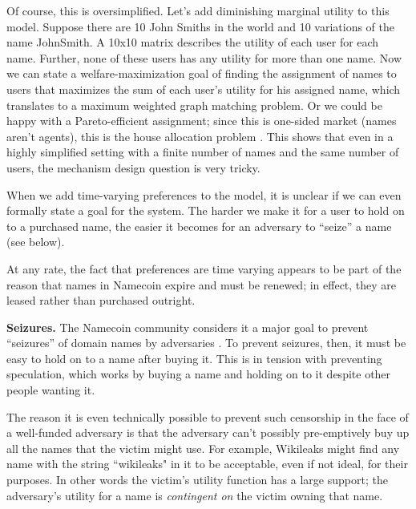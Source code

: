 Of course, this is oversimplified. Let's add diminishing marginal utility to this model. Suppose there are 10 John Smiths in the world and 10 variations of the name \textsf{JohnSmith}. A 10x10 matrix describes the utility of each user for each name. Further, none of these users has any utility for more than one name. Now we can state a welfare-maximization goal of finding the assignment of names to users that maximizes the sum of each user's utility for his assigned name, which translates to a maximum weighted graph matching problem. Or we could be happy with a Pareto-efficient assignment; since this is one-sided market (names aren't agents), this is the house allocation problem \cite{abdulkadiroglu2013matching}. This shows that even in a highly simplified setting with a finite number of names and the same number of users, the mechanism design question is very tricky.

When we add time-varying preferences to the model, it is unclear if we can even formally state a goal for the system. The harder we make it for a user to hold on to a purchased name, the easier it becomes for an adversary to ``seize'' a name (see below).

At any rate, the fact that preferences are time varying appears to be part of the reason that names in Namecoin expire and must be renewed; in effect, they are leased rather than purchased outright.

{\bf Seizures.} The Namecoin community considers it a major goal to prevent ``seizures'' of domain names by adversaries \cite{censorship}. To prevent seizures, then, it must be easy to hold on to a name after buying it. This is in tension with preventing speculation, which works by buying a name and holding on to it despite other people wanting it.

The reason it is even technically possible to prevent such censorship in the face of a well-funded adversary is that the adversary can't possibly pre-emptively buy up all the names that the victim might use. For example, Wikileaks might find any name with the string ``wikileaks" in it to be acceptable, even if not ideal, for their purposes. In other words the victim's utility function has a large support; the adversary's utility for a name is {\em contingent on} the victim owning that name.







